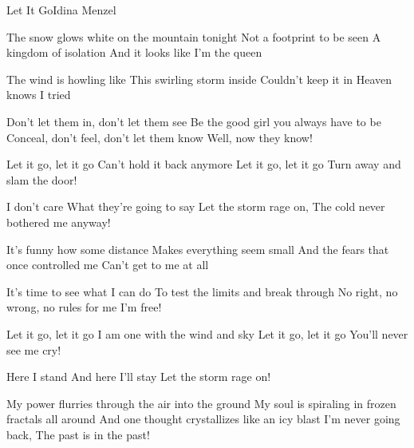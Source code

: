 \documentclass[a4paper,11pt,french]{article}
\begin{document}
\begin{Song}{Let It Go}{Idina Menzel}
\begin{multicols}{2}

\begin{Verse}
The snow glows white on the mountain tonight
Not a footprint to be seen
A kingdom of isolation
And it looks like I'm the queen
\espaceInterStrophe

The wind is howling like 
This swirling storm inside
Couldn't keep it in
Heaven knows I tried
\end{Verse}
\espaceInterStrophe

\begin{PreChorus}
Don't let them in, don't let them see
Be the good girl you always have to be
Conceal, don't feel, don't let them know
Well, now they know!
\end{PreChorus}
\espaceInterStrophe

\begin{Chorus}
Let it go, let it go
Can't hold it back anymore
Let it go, let it go
Turn away and slam the door!
\espaceInterStrophe

I don't care
What they're going to say
Let the storm rage on,
The cold never bothered me anyway!
\end{Chorus}
\espaceInterStrophe

\begin{Verse}
It's funny how some distance
Makes everything seem small
And the fears that once controlled me
Can't get to me at all
\end{Verse}
\espaceInterStrophe

\begin{PreChorus}
It's time to see what I can do
To test the limits and break through
No right, no wrong, no rules for me
I'm free!
\end{PreChorus}
\espaceInterStrophe

\begin{Chorus}
Let it go, let it go
I am one with the wind and sky
Let it go, let it go
You'll never see me cry!
\espaceInterStrophe

Here I stand
And here I'll stay
Let the storm rage on!
\end{Chorus}
\espaceInterStrophe

\begin{Bridge}
My power flurries through the air into the ground
My soul is spiraling in frozen fractals all around
And one thought crystallizes like an icy blast
I'm never going back,
The past is in the past!
\end{Bridge}
\espaceInterStrophe


\end{multicols}
\end{Song}
\end{document}
